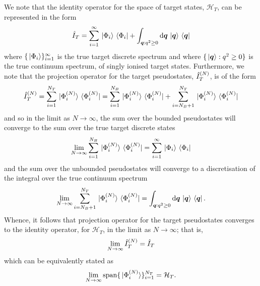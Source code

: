 \documentclass[draft]{article}
\begin{document}
We note that the identity operator for the space of target states,
$\mathcal{H}_{T}$, can be represented in the form
\begin{equation}
  \label{eq:target-identity}
  \hat{I}_{T}
  =
  \sum_{i = 1}^{\infty}
  \ket*{\Phi_{i}}
  \bra*{\Phi_{i}}
  +
  \int_{\boldsymbol{q} : q^{2} \geq 0}
  \dd{\boldsymbol{q}}
  \ket*{\boldsymbol{q}}
  \bra*{\boldsymbol{q}}
\end{equation}
where $\lbrace\ket*{\Phi_{i}}\rbrace_{i = 1}^{\infty}$ is the true target discrete
spectrum and where $\lbrace\ket*{\boldsymbol{q}} : q^{2} \geq 0\rbrace$ is the true
continuum spectrum, of singly ionised target states.
Furthermore, we note that the projection operator for the target pseudostates,
$\hat{I}_{T}^{(N)}$, is of the form
\begin{equation}
  \label{eq:target-projection}
  \hat{I}_{T}^{(N)}
  =
  \sum_{i = 1}^{N_{T}}
  \ket*{\Phi_{i}^{(N)}}
  \bra*{\Phi_{i}^{(N)}}
  =
  \sum_{i = 1}^{N_{B}}
  \ket*{\Phi_{i}^{(N)}}
  \bra*{\Phi_{i}^{(N)}}
  +
  \sum_{i = N_{B} + 1}^{N_{T}}
  \ket*{\Phi_{i}^{(N)}}
  \bra*{\Phi_{i}^{(N)}}
\end{equation}
and so in the limit as $N \to \infty$, the sum over the bounded pseudostates
will converge to the sum over the true target discrete states
\begin{equation}
  \label{eq:target-projection-discrete}
  \lim_{N \to \infty}
  \sum_{i = 1}^{N_{B}}
  \ket*{\Phi_{i}^{(N)}}
  \bra*{\Phi_{i}^{(N)}}
  =
  \sum_{i = 1}^{\infty}
  \ket*{\Phi_{i}}
  \bra*{\Phi_{i}}
\end{equation}
and the sum over the unbounded pseudostates will converge to a discretisation of
the integral over the true continuum spectrum
\begin{equation}
  \label{eq:target-projection-continuum}
  \lim_{N \to \infty}
  \sum_{i = N_{B} + 1}^{N_{T}}
  \ket*{\Phi_{i}^{(N)}}
  \bra*{\Phi_{i}^{(N)}}
  =
  \int_{\boldsymbol{q} : q^{2} \geq 0}
  \dd{\boldsymbol{q}}
  \ket*{\boldsymbol{q}}
  \bra*{\boldsymbol{q}}
  .
\end{equation}
Whence, it follows that projection operator for the target pseudostates
converges to the identity operator, for $\mathcal{H}_{T}$,
in the limit as $N \to \infty$; that is,
\begin{equation}
  \label{eq:target-projection-convergence}
  \lim_{N \to \infty}
  \hat{I}_{T}^{(N)}
  =
  \hat{I}_{T}
\end{equation}
which can be equivalently stated as
\begin{equation}
  \label{eq:target-state-completeness}
  \lim_{N \to \infty}
  \mathrm{span}\lbrace
    \ket*{\Phi_{i}^{(N)}}
  \rbrace_{i = 1}^{N_{T}}
  =
  \mathcal{H}_{T}
  .
\end{equation}
\end{document}
